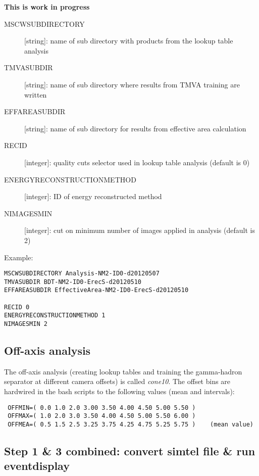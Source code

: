 \documentclass[titlepage,a4paper,twoside,11pt]{report}
\begin{document}
{\bf This is work in progress}

\begin{description}
\item[MSCWSUBDIRECTORY] [string]: name of sub directory with products from the lookup table analysis
\item[TMVASUBDIR] [string]: name of sub directory where results from TMVA training are written 
\item[EFFAREASUBDIR] [string]: name of sub directory for results from effective area calculation
\item[RECID] [integer]: quality cuts selector used in lookup table analysis (default is 0)
\item[ENERGYRECONSTRUCTIONMETHOD] [integer]: ID of energy reconstructed method
\item[NIMAGESMIN] [integer]: cut on minimum number of images applied in analysis (default is 2)
\end{description} 

Example:
\begin{lstlisting}
MSCWSUBDIRECTORY Analysis-NM2-ID0-d20120507
TMVASUBDIR BDT-NM2-ID0-ErecS-d20120510
EFFAREASUBDIR EffectiveArea-NM2-ID0-ErecS-d20120510

RECID 0
ENERGYRECONSTRUCTIONMETHOD 1
NIMAGESMIN 2
\end{lstlisting}

\subsection{Off-axis analysis}

The off-axis analysis (creating lookup tables and training the gamma-hadron separator at different camera offsets) is called {\it cone10}. 
The offset bins are hardwired in the bash scripts to the following values  (mean and intervals):

\begin{lstlisting}
 OFFMIN=( 0.0 1.0 2.0 3.00 3.50 4.00 4.50 5.00 5.50 )
 OFFMAX=( 1.0 2.0 3.0 3.50 4.00 4.50 5.00 5.50 6.00 )
 OFFMEA=( 0.5 1.5 2.5 3.25 3.75 4.25 4.75 5.25 5.75 )    (mean value)
\end{lstlisting}

\subsection{Step 1 \& 3 combined: convert simtel file \& run eventdisplay}
\end{document}
